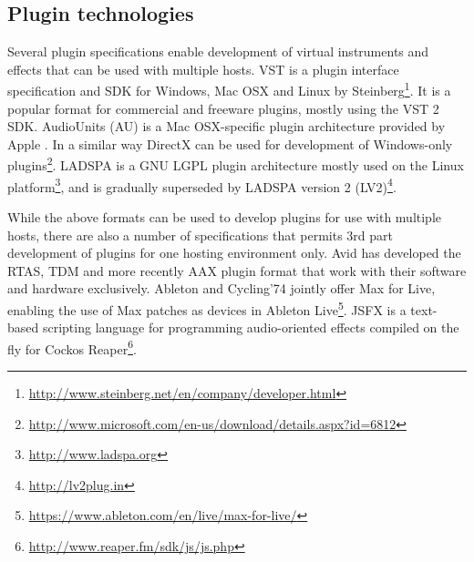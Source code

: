 \documentclass{article}
\begin{document}




\subsection{Plugin technologies}\label{sec:plugin-technologies}

Several plugin specifications enable development of virtual instruments and effects that can be used with multiple hosts.
VST is a plugin interface specification and SDK for Windows, Mac OSX and Linux by Steinberg\footnote{\href{http://www.steinberg.net/en/company/developer.html}{http://www.steinberg.net/en/company/developer.html}}.
It is a popular format for commercial and freeware plugins, mostly using the VST 2 SDK.
AudioUnits (AU) is a Mac OSX-specific plugin architecture provided by Apple \cite{apple2014:au}.
In a similar way DirectX can be used for development of Windows-only plugins\footnote{\href{http://www.microsoft.com/en-us/download/details.aspx?id=6812}{http://www.microsoft.com/en-us/download/details.aspx?id=6812}}.
LADSPA is a GNU LGPL plugin architecture mostly used on the Linux platform\footnote{\href{http://www.ladspa.org}{http://www.ladspa.org}}, and is gradually superseded by LADSPA version 2 (LV2)\footnote{\href{http://lv2plug.in}{http://lv2plug.in}}.

While the above formats can be used to develop plugins for use with multiple hosts, there are also a number of specifications that permits 3rd part development of plugins for one hosting environment only.
Avid has developed the RTAS, TDM and more recently AAX plugin format that work with their software and hardware exclusively.
Ableton and Cycling'74 jointly offer Max for Live, enabling the use of Max patches as devices in Ableton Live\footnote{\href{https://www.ableton.com/en/live/max-for-live/}{https://www.ableton.com/en/live/max-for-live/}}. JSFX is a text-based scripting language for programming audio-oriented effects compiled on the fly for Cockos Reaper\footnote{\href{http://www.reaper.fm/sdk/js/js.php}{http://www.reaper.fm/sdk/js/js.php}}.
\end{document}
